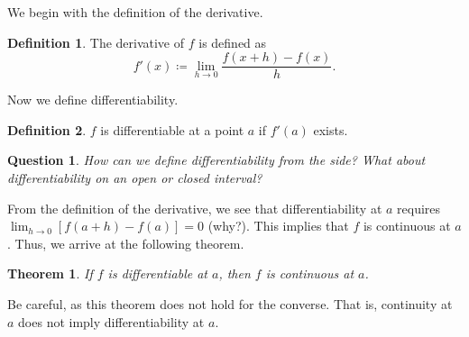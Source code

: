 \documentclass[11pt]{scrartcl}
\theoremstyle{plain}
\newtheorem{theorem}{Theorem}[section]
\newtheorem*{question}{Question}
\theoremstyle{definition}
\newtheorem*{definition}{Definition}
\theoremstyle{remark}
\begin{document}
We begin with the definition of the derivative.

\begin{definition}
    The derivative of $f$ is defined as \[ f'(x)\coloneqq \lim_{ h \to 0 } \frac{{f(x+h)-f(x)}}{h}. \]
\end{definition}

Now we define differentiability. 

\begin{definition}
    $f$ is differentiable at a point $a$ if $f'(a)$ exists.
\end{definition}

\begin{question} 
    How can we define differentiability from the side? What about differentiability on an open or
    closed interval?
\end{question}

From the definition of the derivative, we see that differentiability at $a$ requires $\lim_{ h \to 0 } 
[f(a+h)-f(a)]=0$ (why?). This implies that $f$ is continuous at $a$. Thus, we arrive at the following theorem.

\begin{theorem}
    If $f$ is differentiable at $a$, then $f$ is continuous at $a$.
\end{theorem}

Be careful, as this theorem does not hold for the converse. That is, continuity at $a$ does not imply
differentiability at $a$.
\end{document}
